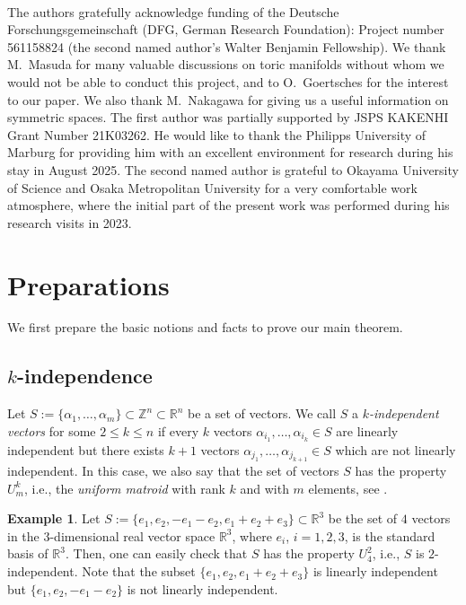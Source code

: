 \documentclass{amsart}
\theoremstyle{definition}
\newtheorem{example}[theorem]{Example}
\theoremstyle{remark}
\numberwithin{equation}{section}
\begin{document}
\

 The authors gratefully acknowledge funding of the Deutsche Forschungsgemeinschaft
(DFG, German Research Foundation): Project number 561158824 (the second named author's Walter Benjamin Fellowship). 
We thank M.~Masuda for many valuable discussions on toric manifolds without whom we would not be able to conduct this project, and to O.~Goertsches for the interest to our paper.
We also thank M.~Nakagawa for giving us a useful information on symmetric spaces.
The first author was partially supported by JSPS KAKENHI Grant Number 21K03262.
He would like to thank the Philipps University of Marburg for providing him with an excellent environment for research during his stay in August 2025.
The second named author is grateful to Okayama University of Science  and Osaka Metropolitan University for a very comfortable work atmosphere, where the initial part of the present work was performed during his research visits in 2023. 

\section{Preparations}\label{sec:prep}
We first prepare the basic notions and facts to prove our main theorem.

\subsection{$k$-independence}
\label{sect:2.1}
Let $S:=\{\alpha_{1},\ldots, \alpha_{m}\}\subset \mathbb{Z}^{n} \subset \mathbb{R}^{n}$ be a set of vectors. 
We call $S$ a {\it $k$-independent vectors} for some $2\le k\le n$ 
if every $k$ vectors $\alpha_{i_{1}},\ldots, \alpha_{i_{k}}\in S$ are linearly independent but there exists $k+1$ vectors $\alpha_{j_{1}},\ldots, \alpha_{j_{k+1}}\in S$ which are not linearly independent.
In this case, we also say that the set of vectors $S$ has the property $U_{m}^{k}$, i.e., 
the {\it uniform matroid} with rank $k$ and with $m$ elements, see \cite{Ox}.

\begin{example}
\label{ex_matroid}
Let $S:=\{e_{1}, e_{2}, -e_{1}-e_{2}, e_{1}+e_{2}+e_{3}\}\subset \mathbb{R}^{3}$ be the set of $4$ vectors in the $3$-dimensional real vector space $\mathbb{R}^{3}$, where $e_{i}$, $i=1,2,3$, is the standard basis of $\mathbb{R}^{3}$.
Then, one can easily check that $S$ has the property $U_{4}^{2}$, i.e., $S$ is $2$-independent.
Note that the subset $\{e_{1},e_{2},e_{1}+e_{2}+e_{3}\}$ is linearly independent but $\{e_{1},e_{2},-e_{1}-e_{2}\}$ is not linearly independent.
\end{example}
\end{document}
